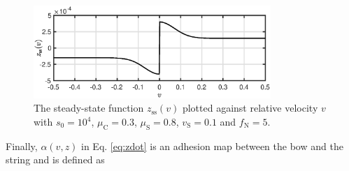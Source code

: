 \begin{figure}[ht]
    \centering
    \includegraphics[width=0.8\textwidth]{figures/exciters/steadyState.eps}
    \caption{\label{fig:zss}The steady-state function $z_\text{ss}(v)$ plotted against relative velocity $v$ with $s_0 = 10^4$, $\mu_\text{C} = 0.3$, $\mu_\text{S} = 0.8$, $v_\text{S} = 0.1$ and $f_\text{N} = 5$.}
\end{figure}

Finally, $\alpha(v,z)$ in Eq. \eqref{eq:zdot} is an adhesion map between the bow and the string and is defined as

